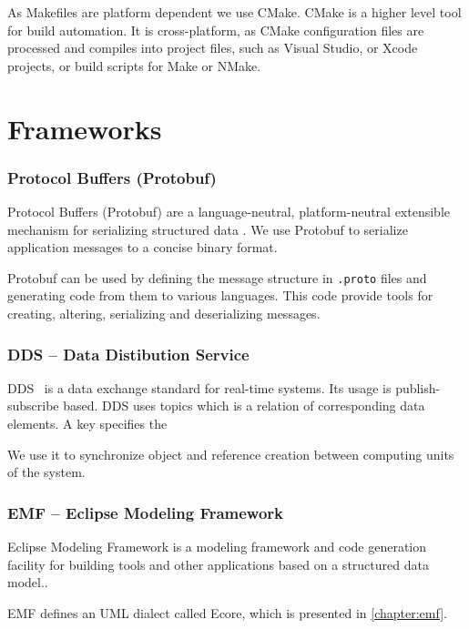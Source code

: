 As Makefiles are platform dependent we use CMake.
CMake is a higher level tool for build automation. 
It is cross-platform, as CMake configuration files are processed and compiles into project files, such as Visual Studio, or Xcode projects, or build scripts for Make or NMake.

\section{Frameworks}

\subsubsection{Protocol Buffers (Protobuf)}
Protocol Buffers (Protobuf) are a language-neutral, platform-neutral extensible mechanism for serializing structured data \cite{protobuf}. 
We use Protobuf to serialize application messages to a concise binary format.

Protobuf can be used by defining the message structure in \texttt{.proto} files and generating code from them to various languages. This code provide tools for creating, altering, serializing and deserializing messages.

\subsubsection{DDS -- Data Distibution Service}

DDS~\cite{DDS} is a data exchange standard for real-time systems. 
Its usage is publish-subscribe based.
DDS uses topics which is a relation of corresponding data elements. 
A key specifies the 

We use it to synchronize object and reference creation between computing units of the system.


\subsubsection{EMF -- Eclipse Modeling Framework}

Eclipse Modeling Framework is a modeling framework and code generation facility for building tools and other applications based on a structured data model.\cite{emf}.

EMF defines an UML dialect called Ecore, which is presented in \autoref{chapter:emf}.



\subsubsection{\protect\viatra{} }


